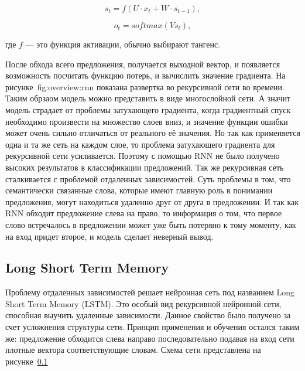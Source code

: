\begin{equation}
  \label{eq:overview:rnn:state}
  s_t = f(U\cdot{x_t} + W\cdot{s_{t-1}}),
\end{equation}

\begin{equation}
  \label{eq:overview:rnn:output}
  o_t = softmax(Vs_t),
\end{equation}
\begin{explanationx}
\item [где] $f$ --- это функция активации, обычно выбирают тангенс.
\end{explanationx}

После обхода всего предложения, получается выходной вектор, и появляется возможность посчитать функцию потерь, и вычислить значение градиента. На рисунке~{fig:overview:rnn} показана развертка во рекурсивной сети во времени. Таким обрзаом модель можно представить в виде многослойной сети. А значит модель страдает от проблемы затухающего градиента, когда градиентный спуск необходимо произвести на множество слоев вниз, и значение функции ошибки может очень сильно отличаться от реального её значения. Но так как применяется одна и та же сеть на каждом слое, то проблема затухающего градиента для рекурсивной сети усиливается. Поэтому с помощью RNN не было получено высоких результатов в классификации предложений. Так же рекурсивная сеть сталкивается с проблемой отдаленных зависимостей. Суть проблемы в том, что семантически связанные слова, которые имеют главную роль в понимании предложения, могут находиться удаленно друг от друга в предложении. И так как RNN обходит предложение слева на право, то информация о том, что первое слово встречалось в предложении может уже быть потеряно к тому моменту, как на вход придет второе, и модель сделает неверный вывод.

\subsection{Long Short Term Memory}\label{fig:overview:lstm}
Проблему отдаленных зависимостей решает нейронная сеть под названием Long Short Term Memory (LSTM). Это особый вид рекурсивной нейронной сети, способная выучить удаленные зависимости. Данное свойство было получено за счет усложнения структуры сети. Принцип применения и обучения остался таким же: предложение обходится слева направо последовательно подавая на вход сети плотные вектора соответствующие словам. Схема сети представлена на рисунке~\ref{fig:overview:lstm}

